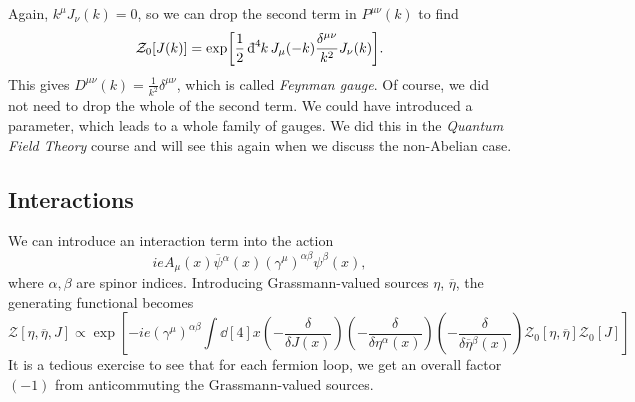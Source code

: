 Again, $k^{\mu} J_{\nu}(k) = 0$, so we can drop the second term in $P^{\mu\nu}(k)$ to find 
\begin{equation}
  \mathcal{Z}_0[J(k)] = \exp[\frac{1}{2} \bdd[4]{k} J_{\mu}(-k) \frac{\delta^{\mu\nu}}{k^2} J_{\nu}(k)].
\end{equation}
This gives $D^{\mu\nu}(k) = \frac{1}{k^2} \delta^{\mu\nu}$, which is called \emph{Feynman gauge}.
Of course, we did not need to drop the whole of the second term. We could have introduced a parameter, which leads to a whole family of gauges. We did this in the \emph{Quantum Field Theory} course and will see this again when we discuss the non-Abelian case.

\subsection*{Interactions}%

We can introduce an interaction term into the action
\begin{equation}
  ie A_{\mu} (x) \overline{\psi}{}^{\alpha}(x) (\gamma^{\mu})^{\alpha\beta} \psi^{\beta}(x),
\end{equation}
where $\alpha, \beta$ are spinor indices.
Introducing Grassmann-valued sources $\eta$, $\overline{\eta}{}$, the generating functional becomes
\begin{equation}
  \mathcal{Z}[\eta, \overline{\eta}{}, J] \propto \exp[-i e (\gamma^{\mu})^{\alpha\beta} \int \dd[4]{x} \left( -\frac{\delta}{\delta J(x)} \right) \left( - \frac{\delta }{\delta \eta^{\alpha}(x)} \right) \left( -\frac{\delta }{\delta \overline{\eta}{}^{\beta}(x)} \right) \mathcal{Z}_0 [\eta, \overline{\eta}{}] \mathcal{Z}_0[J]]
\end{equation}
It is a tedious exercise to see that for each fermion loop, we get an overall factor $(-1)$ from anticommuting the Grassmann-valued sources.

